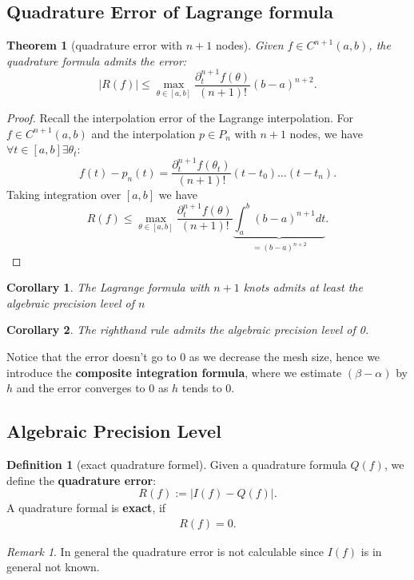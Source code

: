 \documentclass[a4paper,12pt,oneside,fleqn]{book}
\newtheorem{theorem}{Theorem}[section]
\newtheorem{corollary}{Corollary}[theorem]
\theoremstyle{definition}
\newtheorem{definition}{Definition}[section]
\theoremstyle{remark}
\newtheorem*{remark}{Remark}
\begin{document}
\subsection{Quadrature Error of Lagrange formula}
\begin{theorem}[quadrature error with $n + 1$ nodes]
	Given $f \in C^{n + 1}(a, b)$, the quadrature formula admits the   error:
	\begin{equation}
		|R(f)| \le \max_{\theta \in [a, b]} \frac{\partial^{n + 1}_t f(\theta)}{(n + 1)!} (b - a)^{n + 2}. 
	\end{equation}
\end{theorem}
\begin{proof}
Recall the interpolation error of the Lagrange interpolation. For $f \in C^{n + 1}(a, b)$ and the interpolation $p \in P_n$ with $n + 1$ nodes, we have  $\forall t \in [a, b] \exists \theta_t$: 
\begin{equation}
	f(t) - p_n(t) = \frac{\partial^{n + 1}_t f(\theta_t)}{(n+1)!}(t - t_0) \dots (t - t_n). 
\end{equation}
Taking integration over $[a, b]$ we have
\begin{equation}
	R(f)  \le \max_{ \theta \in [a, b]} \frac{\partial_t^{n + 1} f(\theta)}{(n + 1)!}  \underbrace{\int_a^b (b - a)^{n + 1} dt}_{ = (b - a)^{n + 2}}.  
\end{equation}
\end{proof}

\begin{corollary}
	The Lagrange formula with $n + 1$ knots admits at least the algebraic precision level of $n$ 
\end{corollary}

\begin{corollary}
	The righthand rule admits the algebraic precision level of 0. 
\end{corollary}

Notice that the error doesn't go to 0 as we decrease the mesh size, hence we introduce the \textbf{composite integration formula}, where we estimate $(\beta - \alpha)$ by $h$ and the error converges to 0 as $h$ tends to 0. 






\subsection{Algebraic Precision Level}
\begin{definition}[exact quadrature formel]
Given a quadrature formula $Q(f)$, we define the \textbf{quadrature error}:
\begin{equation}
	R(f):= |I(f) - Q(f)|. 
\end{equation}
A quadrature formal is \textbf{exact}, if
\begin{align*}
	R(f) = 0.
\end{align*}
\end{definition}
\begin{remark}
In general the quadrature error is not calculable since $I(f)$ is in general not known.
\end{remark}
\end{document}
